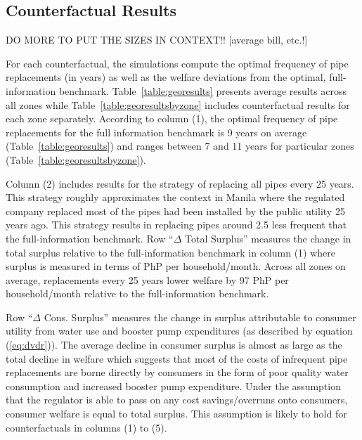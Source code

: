 \documentclass[12pt,table]{article}
\begin{document}



\subsection{Counterfactual Results}\label{section:counterresults}

DO MORE TO PUT THE SIZES IN CONTEXT!! [average bill, etc.!]



For each counterfactual, the simulations compute the optimal frequency of pipe replacements (in years) as well as the welfare deviations from the optimal, full-information benchmark.  Table~\ref{table:georesults} presents average results across all zones while Table~\ref{table:georesultsbyzone} includes counterfactual results for each zone separately.  According to column (1), the optimal frequency of pipe replacements for the full information benchmark is 9 years on average (Table~\ref{table:georesults}) and ranges between 7 and 11 years for particular zones (Table~\ref{table:georesultsbyzone}).  

Column (2) includes results for the strategy of replacing all pipes every 25 years.  This strategy roughly approximates the context in Manila where the regulated company replaced most of the pipes had been installed by the public utility 25 years ago.  This strategy results in replacing pipes around 2.5 less frequent that the full-information benchmark.  Row ``$\Delta$ Total Surplus'' measures the change in total surplus relative to the full-information benchmark in column (1) where surplus is measured in terms of PhP per household/month.  Across all zones on average, replacements every 25 years lower welfare by 97 PhP per household/month relative to the full-information benchmark.  

Row ``$\Delta$ Cons. Surplus'' measures the change in surplus attributable to consumer utility from water use and booster pump expenditures (as described by equation (\ref{eq:dvdr})).  The average decline in consumer surplus is almost as large as the total decline in welfare which suggests that most of the costs of infrequent pipe replacements are borne directly by consumers in the form of poor quality water consumption and increased booster pump expenditure.  Under the assumption that the regulator is able to pass on any cost savings/overruns onto consumers, consumer welfare is equal to total surplus.  This assumption is likely to hold for counterfactuals in columns (1) to (5).
\end{document}
